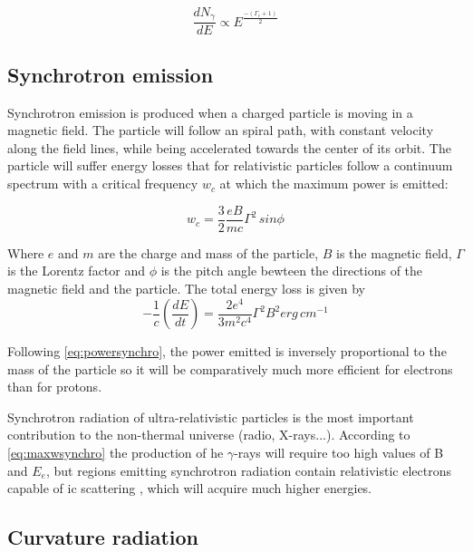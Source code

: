 \documentclass[main.tex]{subfiles}
\begin{document}
\begin{equation}
    \frac{dN_{\gamma}}{dE} \propto E^{\frac{-(\Gamma_e + 1)}{2}}
\end{equation}


\subsection{Synchrotron emission}

Synchrotron emission is produced when a charged particle is moving in a magnetic field. The particle will follow an spiral path, with constant velocity along the field lines, while being accelerated towards the center of its orbit. The particle will suffer energy losses that for relativistic particles follow a continuum spectrum \cite{weekes2003HEAstrophy} with a critical frequency $w_c$ at which the maximum power is emitted:

\begin{equation}\label{eq:maxwsynchro}
    w_c = \frac{3}{2}\frac{eB}{mc}\Gamma^2\,sin\phi
\end{equation}

Where $e$ and $m$ are the charge and mass of the particle, $B$ is the magnetic field, $\Gamma$ is the Lorentz factor and $\phi$ is the pitch angle bewteen the directions of the magnetic field and the particle.
The total energy loss is given by
\begin{equation} \label{eq:powersynchro}
    -\frac{1}{c}\left( \frac{dE}{dt} \right) = \frac{2e^4}{3m^2c^4}\Gamma^2 B^2  erg \, cm^{-1}
\end{equation}

Following \ref{eq:powersynchro}, the power emitted is inversely proportional to the mass of the particle so it will be comparatively much more efficient for electrons than for protons. 

Synchrotron radiation of ultra-relativistic particles is the most important contribution to the non-thermal universe (radio, X-rays...). According to \ref{eq:maxwsynchro} the production of \gls{he} $\gamma$-rays will require too high values of B and $E_e$, but regions emitting synchrotron radiation contain relativistic electrons capable of \gls{ic} scattering \cite{HarwitAstroconcepts},  which will acquire much higher energies. 

\subsection{Curvature radiation}
\end{document}
